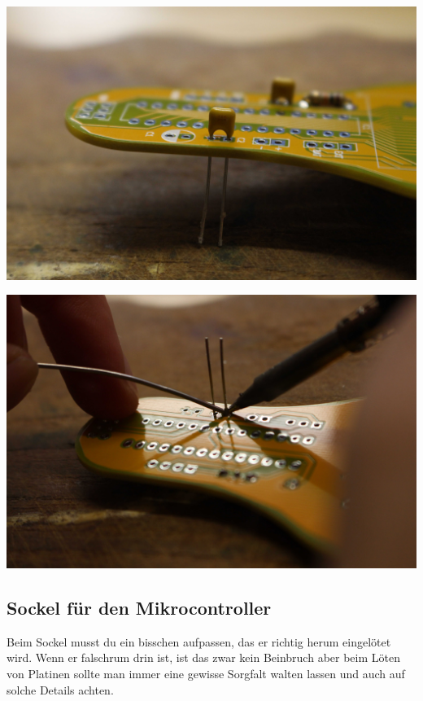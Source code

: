 \documentclass{article}
\begin{document}
\begin{minipage}[b]{0.5\textwidth}
	\includegraphics[width=\textwidth]{Bilder/IMG_5551.JPG}
	\label{fig:}
\end{minipage}
\begin{minipage}[b]{0.5\textwidth}
	\includegraphics[width=\textwidth]{Bilder/IMG_5552.JPG}
	\label{fig:}
\end{minipage}

\subsection{Sockel für den Mikrocontroller}

Beim Sockel musst du ein bisschen aufpassen, das er richtig herum eingelötet wird. Wenn er falschrum drin ist, ist das zwar kein Beinbruch aber beim Löten von Platinen sollte man immer eine gewisse Sorgfalt walten lassen und auch auf solche Details achten.
\end{document}
